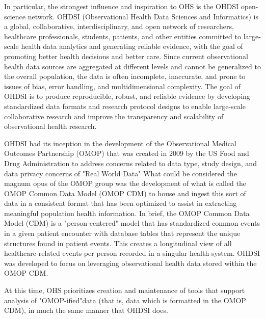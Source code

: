 \documentclass{juliacon}
\begin{document}
In particular, the strongest influence and inspiration to OHS is the OHDSI open-science network.
OHDSI (Observational Health Data Sciences and Informatics) is a global, collaborative, interdisciplinary, and open network of researchers, healthcare professionals, students, patients, and other entities committed to large-scale health data analytics and generating reliable evidence, with the goal of promoting better health decisions and better care. 
Since current observational health data sources are aggregated at different levels and cannot be generalized to the overall population, the data is often incomplete, inaccurate, and prone to issues of bias, error handling, and multidimensional complexity. 
The goal of OHDSI is to produce reproducible, robust, and reliable evidence by developing standardized data formats and research protocol designs to enable large-scale collaborative research and improve the transparency and scalability of observational health research. 

OHDSI had its inception in the development of the Observational Medical Outcomes Partnership (OMOP) that was created in 2009 by the US Food and Drug Administration to address concerns related to data type, study design, and data privacy concerns of "Real World Data" \cite{ohdsi2019book} \cite{FDARealWorldEvidence}
What could be considered the magnum opus of the OMOP group was the development of what is called the OMOP Common Data Model (OMOP CDM) to house and ingest this sort of data in a consistent format that has been optimized to assist in extracting meaningful population health information.
In brief, the OMOP Common Data Model (CDM) is a "person-centered" model that has standardized common events in a given patient encounter with database tables that represent the unique structures found in patient events.
This creates a longitudinal view of all healthcare-related events per person recorded in a singular health system.
OHDSI was developed to focus on leveraging observational health data stored within the OMOP CDM.

At this time, OHS prioritizes creation and maintenance of tools that support analysis of "OMOP-ified"\footnotemark data (that is, data which is formatted in the OMOP CDM), in much the same manner that OHDSI does.

\end{document}
